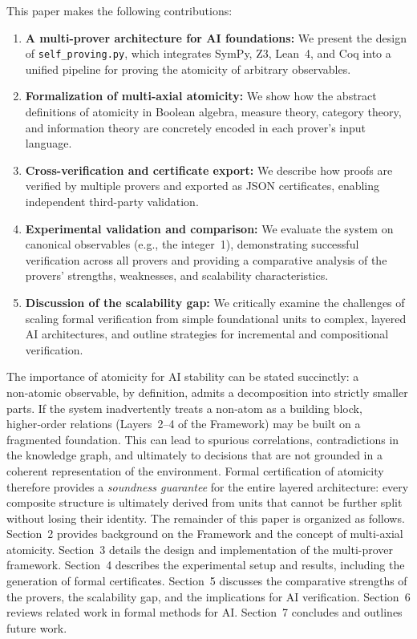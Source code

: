 This paper makes the following contributions:
\begin{enumerate}
    \item \textbf{A multi-prover architecture for AI foundations:} We present the design of \texttt{self\_proving.py}, which integrates SymPy, Z3, Lean~4, and Coq into a unified pipeline for proving the atomicity of arbitrary observables.
    \item \textbf{Formalization of multi-axial atomicity:} We show how the abstract definitions of atomicity in Boolean algebra, measure theory, category theory, and information theory are concretely encoded in each prover's input language.
    \item \textbf{Cross-verification and certificate export:} We describe how proofs are verified by multiple provers and exported as JSON certificates, enabling independent third-party validation.
    \item \textbf{Experimental validation and comparison:} We evaluate the system on canonical observables (e.g., the integer~1), demonstrating successful verification across all provers and providing a comparative analysis of the provers' strengths, weaknesses, and scalability characteristics.
    \item \textbf{Discussion of the scalability gap:} We critically examine the challenges of scaling formal verification from simple foundational units to complex, layered AI architectures, and outline strategies for incremental and compositional verification.
\end{enumerate}
The importance of atomicity for AI stability can be stated succinctly:
a non‑atomic observable, by definition, admits a decomposition into
strictly smaller parts.  If the system inadvertently treats a
non‑atom as a building block, higher‑order relations (Layers~2–4
of the \Apeiron{} Framework) may be built on a fragmented foundation.
This can lead to spurious correlations, contradictions in the knowledge
graph, and ultimately to decisions that are not grounded in a coherent
representation of the environment.  Formal certification of atomicity
therefore provides a \emph{soundness guarantee} for the entire layered
architecture: every composite structure is ultimately derived from
units that cannot be further split without losing their identity.
The remainder of this paper is organized as follows. Section~2 provides background on the \Apeiron{} Framework and the concept of multi-axial atomicity. Section~3 details the design and implementation of the multi-prover framework. Section~4 describes the experimental setup and results, including the generation of formal certificates. Section~5 discusses the comparative strengths of the provers, the scalability gap, and the implications for AI verification. Section~6 reviews related work in formal methods for AI. Section~7 concludes and outlines future work.
